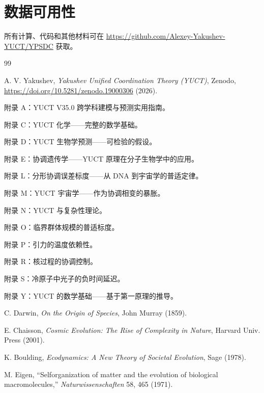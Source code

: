 \documentclass[12pt,a4paper]{article}
\theoremstyle{remark}
\begin{document}
		\section*{数据可用性}
		
		所有计算、代码和其他材料可在 \url{https://github.com/Alexey-Yakushev-YUCT/YPSDC} 获取。
		
		\begin{thebibliography}{99}
			
			A. V. Yakushev, \emph{Yakushev Unified Coordination Theory (YUCT)}, Zenodo, \url{https://doi.org/10.5281/zenodo.19000306} (2026).
			
			附录 A：YUCT V35.0 跨学科建模与预测实用指南。
			
			附录 C：YUCT 化学——完整的数学基础。
			
			附录 D：YUCT 生物学预测——可检验的假设。
			
			附录 E：协调遗传学——YUCT 原理在分子生物学中的应用。
			
			附录 L：分形协调误差标度——从 DNA 到宇宙学的普适定律。
			
			附录 M：YUCT 宇宙学——作为协调相变的暴胀。
			
			附录 N：YUCT 与复杂性理论。
			
			附录 O：临界群体规模的普适标度。
			
			附录 P：引力的温度依赖性。
			
			附录 R：核过程的协调控制。
			
			附录 S：冷原子中光子的负时间延迟。
			
			附录 Y：YUCT 的数学基础——基于第一原理的推导。
			
			C. Darwin, \emph{On the Origin of Species}, John Murray (1859).
			
			E. Chaisson, \emph{Cosmic Evolution: The Rise of Complexity in Nature}, Harvard Univ. Press (2001).
			
			K. Boulding, \emph{Ecodynamics: A New Theory of Societal Evolution}, Sage (1978).
			
			M. Eigen, ``Selforganization of matter and the evolution of biological macromolecules,'' \emph{Naturwissenschaften} 58, 465 (1971).
			

\end{thebibliography}
\end{document}
